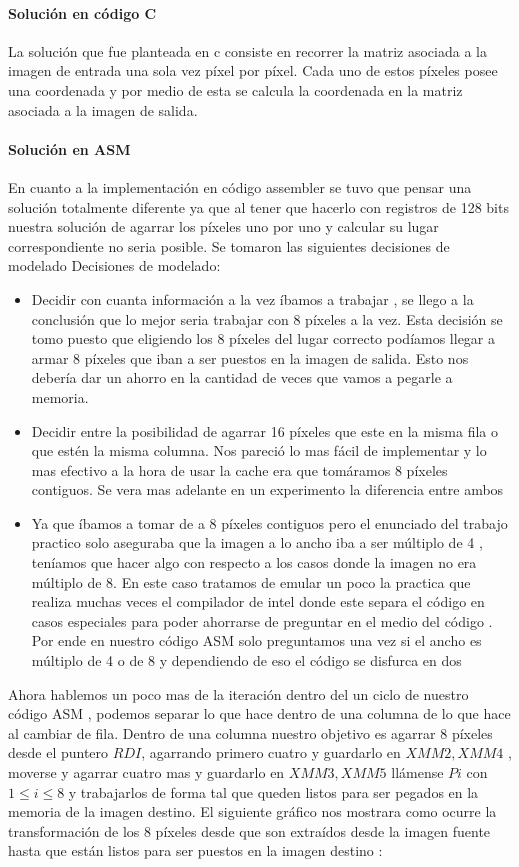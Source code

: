 \paragraph{Solución en código C}
La solución que fue planteada en c consiste en recorrer la matriz asociada a la imagen de entrada una sola vez píxel por píxel. Cada uno de estos píxeles posee una coordenada y por medio de esta se calcula la coordenada en la matriz asociada a la imagen de salida. 


\paragraph{Solución en ASM}
En cuanto a la implementación en código assembler se tuvo que pensar una solución totalmente diferente ya que al tener que hacerlo con registros de 128 bits nuestra solución de agarrar los píxeles uno por uno y calcular su lugar correspondiente no seria posible. Se tomaron las siguientes decisiones de modelado Decisiones de modelado:
\begin{itemize}
\item Decidir con cuanta información a la vez íbamos a trabajar , se llego a la conclusión que lo mejor seria trabajar con 8 píxeles a la vez. Esta decisión se tomo puesto que eligiendo los 8 píxeles del lugar correcto podíamos llegar a armar 8 píxeles que iban a ser puestos en la imagen de salida. Esto nos debería dar un ahorro en la cantidad de veces que vamos a pegarle a memoria.
\item Decidir entre la posibilidad de agarrar 16 píxeles que este en la misma fila o que estén la misma columna. Nos pareció lo mas fácil de implementar y lo mas efectivo a la hora de usar la cache era que tomáramos 8 píxeles contiguos. Se vera mas adelante en un experimento la diferencia entre ambos
\item Ya que íbamos a tomar de a 8 píxeles contiguos pero el enunciado del trabajo practico solo aseguraba que la imagen a lo ancho iba a ser múltiplo de 4 , teníamos que hacer algo con respecto a los casos donde la imagen no era múltiplo de 8. En este caso tratamos de emular un poco la practica que realiza muchas veces el compilador de intel donde este separa el código en casos especiales para poder ahorrarse de preguntar en el medio del código . Por ende en nuestro código ASM solo preguntamos una vez si el ancho es múltiplo de 4 o de 8 y dependiendo de eso el código se disfurca en dos
\end{itemize}

Ahora hablemos un poco mas de la iteración dentro del un ciclo de nuestro código ASM , podemos separar lo que hace dentro de una columna de lo que hace al cambiar de fila. Dentro de una columna nuestro objetivo es agarrar 8 píxeles desde el puntero $RDI$, agarrando primero cuatro y guardarlo en $XMM2, XMM4$ , moverse y agarrar cuatro mas y guardarlo en $XMM3, XMM5$ llámense $Pi$ con $1\leq i\leq 8$ y trabajarlos de forma tal que queden listos para ser pegados en la memoria de la imagen destino. El siguiente gráfico nos mostrara como ocurre la transformación de los 8 píxeles desde que son extraídos desde la imagen fuente hasta que están listos para ser puestos en la imagen destino : 

